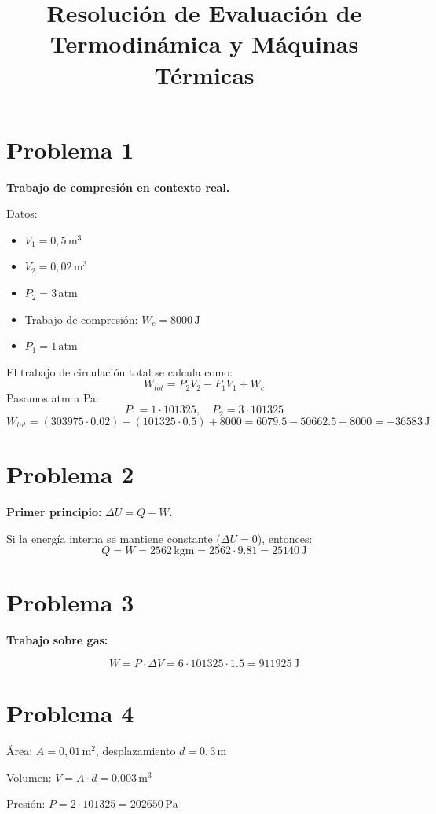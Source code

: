 \documentclass[11pt,a4paper]{article}
\title{Resolución de Evaluación de Termodinámica y Máquinas Térmicas}
\date{}
\begin{document}
\maketitle

\section*{Problema 1}
\textbf{Trabajo de compresión en contexto real.}

Datos:
\begin{itemize}
    \item $V_1 = 0{,}5 \, \mathrm{m}^3$
    \item $V_2 = 0{,}02 \, \mathrm{m}^3$
    \item $P_2 = 3 \, \mathrm{atm}$
    \item Trabajo de compresión: $W_c = 8000 \, \mathrm{J}$
    \item $P_1 = 1 \, \mathrm{atm}$
\end{itemize}

El trabajo de circulación total se calcula como:
\[
W_{tot} = P_2 V_2 - P_1 V_1 + W_c
\]
Pasamos atm a Pa:
\[
P_1 = 1 \cdot 101325, \quad P_2 = 3 \cdot 101325
\]
\[
W_{tot} = (303975 \cdot 0.02) - (101325 \cdot 0.5) + 8000 = 6079.5 - 50662.5 + 8000 = -36583 \, \mathrm{J}
\]

\section*{Problema 2}
\textbf{Primer principio:} $\Delta U = Q - W$.

Si la energía interna se mantiene constante ($\Delta U = 0$), entonces:
\[
Q = W = 2562 \, \mathrm{kgm} = 2562 \cdot 9.81 = 25140 \, \mathrm{J}
\]

\section*{Problema 3}
\textbf{Trabajo sobre gas:}

\[
W = P \cdot \Delta V = 6 \cdot 101325 \cdot 1.5 = 911925 \, \mathrm{J}
\]

\section*{Problema 4}
Área: $A = 0{,}01 \, \mathrm{m}^2$, desplazamiento $d = 0{,}3 \, \mathrm{m}$

Volumen: $V = A \cdot d = 0.003 \, \mathrm{m}^3$

Presión: $P = 2 \cdot 101325 = 202650 \, \mathrm{Pa}$
\end{document}
